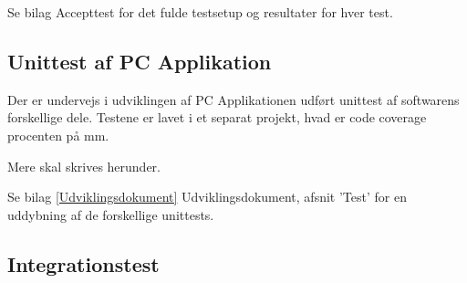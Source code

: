 Se bilag Accepttest for det fulde testsetup og resultater for hver test. 

\subsection{Unittest af PC Applikation}
Der er undervejs i udviklingen af PC Applikationen udført unittest af softwarens forskellige dele. 
Testene er lavet i et separat projekt, hvad er code coverage procenten på mm. 

Mere skal skrives herunder. 

Se bilag \ref{Udviklingsdokument} Udviklingsdokument, afsnit 'Test' for en uddybning af de forskellige unittests. 

\subsection{Integrationstest}